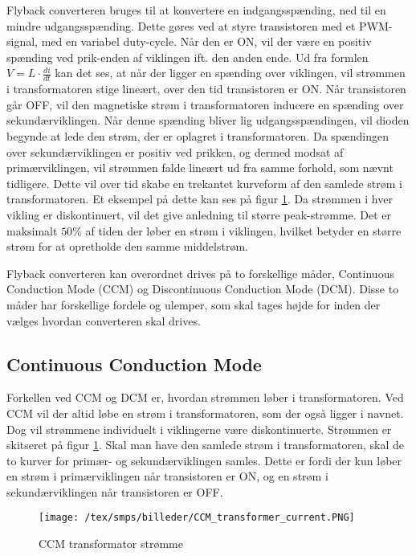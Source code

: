 Flyback converteren bruges til at konvertere en indgangsspænding, ned til en mindre udgangsspænding. Dette gøres ved at styre transistoren med et PWM-signal, med en variabel duty-cycle. Når den er ON, vil der være en positiv spænding ved prik-enden af viklingen ift. den anden ende. Ud fra formlen $V=L\cdot \frac{di}{dt}$ kan det ses, at når der ligger en spænding over viklingen, vil strømmen i transformatoren stige lineært, over den tid transistoren er ON. Når transistoren går OFF, vil den magnetiske strøm i transformatoren inducere en spænding over sekundærviklingen. Når denne spænding bliver lig udgangsspændingen, vil dioden begynde at lede den strøm, der er oplagret i transformatoren. Da spændingen over sekundærviklingen er positiv ved prikken, og dermed modsat af primærviklingen, vil strømmen falde lineært ud fra samme forhold, som nævnt tidligere. Dette vil over tid skabe en trekantet kurveform af den samlede strøm i transformatoren. Et eksempel på dette kan ses på figur \ref{fig:CCM_transformer_current}. Da strømmen i hver vikling er diskontinuert, vil det give anledning til større peak-strømme. Det er maksimalt $50\percent$ af tiden der løber en strøm i viklingen, hvilket betyder en større strøm for at opretholde den samme middelstrøm.

Flyback converteren kan overordnet drives på to forskellige måder, Continuous Conduction Mode (CCM) og Discontinuous Conduction Mode (DCM). Disse to måder har forskellige fordele og ulemper, som skal tages højde for inden der vælges hvordan converteren skal drives. 

\subsection{Continuous Conduction Mode}
Forkellen ved CCM og DCM er, hvordan strømmen løber i transformatoren. Ved CCM vil der altid løbe en strøm i transformatoren, som der også ligger i navnet. Dog vil strømmene individuelt i viklingerne være diskontinuerte. Strømmen er skitseret på figur \ref{fig:CCM_transformer_current}. Skal man have den samlede strøm i transformatoren, skal de to kurver for primær- og sekundærviklingen samles. Dette er fordi der kun løber en strøm i primærviklingen når transistoren er ON, og en strøm i sekundærviklingen når transistoren er OFF. 

\begin{figure}[H]
	\center
	\texttt{[image: /tex/smps/billeder/CCM\_transformer\_current.PNG]}
	\caption{CCM transformator strømme}
	\label{fig:CCM_transformer_current}
\end{figure}

